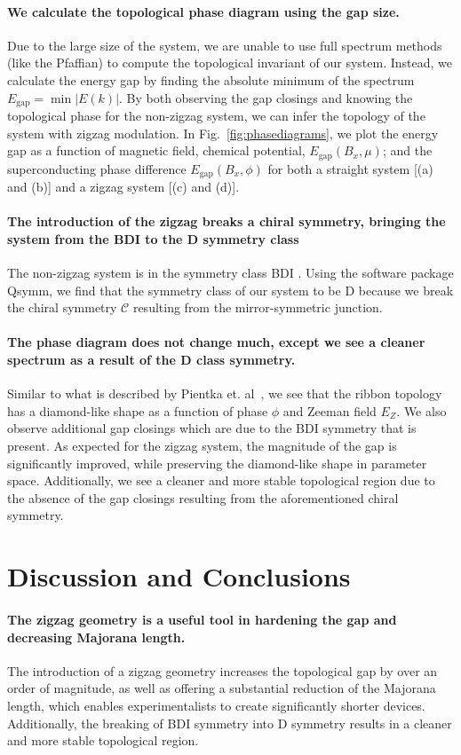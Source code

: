 \documentclass[english, twocolumn, 10pt, aps, superscriptaddress, floatfix, prb, citeautoscript]{revtex4-1}
\renewcommand{\comment}[2]{#2}
\renewcommand{\comment}{\paragraph}
\begin{document}
\comment{We calculate the topological phase diagram using the gap size.}
Due to the large size of the system, we are unable to use full spectrum methods (like the Pfaffian) to compute the topological invariant of our system.
Instead, we calculate the energy gap by finding the absolute minimum of the spectrum $E_\textrm{gap}=\min{|E(k)|}$.
By both observing the gap closings and knowing the topological phase for the non-zigzag system, we can infer the topology of the system with zigzag modulation.
In Fig.~\ref{fig:phasediagrams}, we plot the energy gap as a function of magnetic field, chemical potential, $E_\textrm{gap}(B_x, \mu)$; and the superconducting phase difference $E_\textrm{gap}(B_x, \phi)$ for both a straight system [(a) and (b)] and a zigzag system [(c) and (d)].

\comment{The introduction of the zigzag breaks a chiral symmetry, bringing the system from the BDI to the D symmetry class}
The non-zigzag system is in the symmetry class BDI \cite{pientka2017topological}.
Using the software package Qsymm\cite{varjas2018qsymm}, we find that the symmetry class of our system to be D because we break the chiral symmetry $\mathcal{C}$ resulting from the mirror-symmetric junction.

\comment{The phase diagram does not change much, except we see a cleaner spectrum as a result of the D class symmetry.}
Similar to what is described by Pientka et. al~\cite{pientka2017topological}, we see that the ribbon topology has a diamond-like shape as a function of phase $\phi$ and Zeeman field $E_Z$.
We also observe additional gap closings which are due to the BDI symmetry that is present.
As expected for the zigzag system, the magnitude of the gap is significantly improved, while preserving the diamond-like shape in parameter space.
Additionally, we see a cleaner and more stable topological region due to the absence of the gap closings resulting from the aforementioned chiral symmetry.

\section{Discussion and Conclusions}

\comment{The zigzag geometry is a useful tool in hardening the gap and decreasing Majorana length.}
The introduction of a zigzag geometry increases the topological gap by over an order of magnitude, as well as offering a substantial reduction of the Majorana length, which enables experimentalists to create significantly shorter devices.
Additionally, the breaking of BDI symmetry into D symmetry results in a cleaner and more stable topological region.
\end{document}
